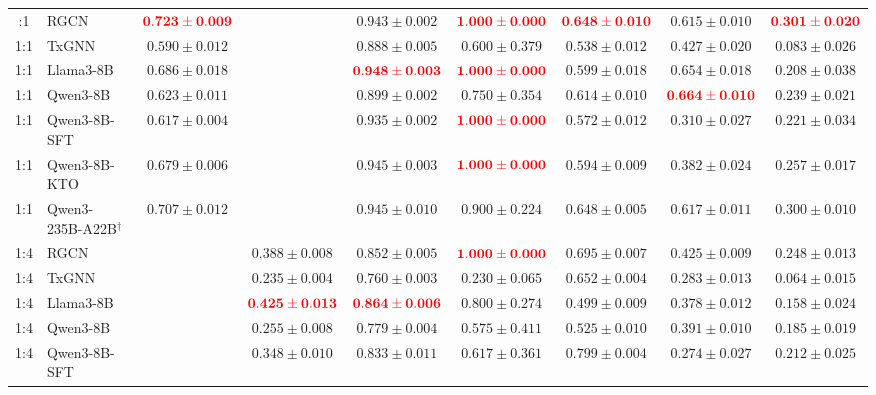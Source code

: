\documentclass[pdflatex,sn-mathphys-num]{sn-jnl}
\begin{document}
\begin{landscape}
\begin{longtable}{clccccccc}
\bottomrule
\endlastfoot
1:1 & RGCN & \(\textcolor{red}{\mathbf{0.723 \pm 0.009}}\) &  & \(0.943 \pm 0.002\) & \(\textcolor{red}{\mathbf{1.000 \pm 0.000}}\) & \(\textcolor{red}{\mathbf{0.648 \pm 0.010}}\) & \(0.615 \pm 0.010\) & \(\textcolor{red}{\mathbf{0.301 \pm 0.020}}\) \\
1:1 & TxGNN & \(0.590 \pm 0.012\) &  & \(0.888 \pm 0.005\) & \(0.600 \pm 0.379\) & \(0.538 \pm 0.012\) & \(0.427 \pm 0.020\) & \(0.083 \pm 0.026\) \\
1:1 & Llama3-8B & \(0.686 \pm 0.018\) &  & \(\textcolor{red}{\mathbf{0.948 \pm 0.003}}\) & \(\textcolor{red}{\mathbf{1.000 \pm 0.000}}\) & \(0.599 \pm 0.018\) & \(\mathbf{0.654 \pm 0.018}\) & \(0.208 \pm 0.038\) \\
1:1 & Qwen3-8B & \(0.623 \pm 0.011\) &  & \(0.899 \pm 0.002\) & \(0.750 \pm 0.354\) & \(0.614 \pm 0.010\) & \(\textcolor{red}{\mathbf{0.664 \pm 0.010}}\) & \(0.239 \pm 0.021\) \\
1:1 & Qwen3-8B-SFT & \(0.617 \pm 0.004\) &  & \(0.935 \pm 0.002\) & \(\textcolor{red}{\mathbf{1.000 \pm 0.000}}\) & \(0.572 \pm 0.012\) & \(0.310 \pm 0.027\) & \(0.221 \pm 0.034\) \\
1:1 & Qwen3-8B-KTO & \(0.679 \pm 0.006\) &  & \(\mathbf{0.945 \pm 0.003}\) & \(\textcolor{red}{\mathbf{1.000 \pm 0.000}}\) & \(0.594 \pm 0.009\) & \(0.382 \pm 0.024\) & \(0.257 \pm 0.017\) \\
1:1 & Qwen3-235B-A22B$^{\dagger}$ & \(\mathbf{0.707 \pm 0.012}\) &  & \(0.945 \pm 0.010\) & \(\mathbf{0.900 \pm 0.224}\) & \(\mathbf{0.648 \pm 0.005}\) & \(0.617 \pm 0.011\) & \(\mathbf{0.300 \pm 0.010}\) \\
\midrule
1:4 & RGCN &  & \(0.388 \pm 0.008\) & \(0.852 \pm 0.005\) & \(\textcolor{red}{\mathbf{1.000 \pm 0.000}}\) & \(0.695 \pm 0.007\) & \(\mathbf{0.425 \pm 0.009}\) & \(0.248 \pm 0.013\) \\
1:4 & TxGNN &  & \(0.235 \pm 0.004\) & \(0.760 \pm 0.003\) & \(0.230 \pm 0.065\) & \(0.652 \pm 0.004\) & \(0.283 \pm 0.013\) & \(0.064 \pm 0.015\) \\
1:4 & Llama3-8B &  & \(\textcolor{red}{\mathbf{0.425 \pm 0.013}}\) & \(\textcolor{red}{\mathbf{0.864 \pm 0.006}}\) & \(0.800 \pm 0.274\) & \(0.499 \pm 0.009\) & \(0.378 \pm 0.012\) & \(0.158 \pm 0.024\) \\
1:4 & Qwen3-8B &  & \(0.255 \pm 0.008\) & \(0.779 \pm 0.004\) & \(0.575 \pm 0.411\) & \(0.525 \pm 0.010\) & \(0.391 \pm 0.010\) & \(0.185 \pm 0.019\) \\
1:4 & Qwen3-8B-SFT &  & \(0.348 \pm 0.010\) & \(0.833 \pm 0.011\) & \(0.617 \pm 0.361\) & \(\mathbf{0.799 \pm 0.004}\) & \(0.274 \pm 0.027\) & \(0.212 \pm 0.025\) \\

\end{longtable}
\end{landscape}
\end{document}
